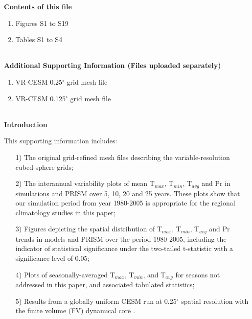 \documentclass[draft,ms]{agutexSI}
\begin{document}
\begin{article}

%
%



\noindent\textbf{Contents of this file}
\begin{enumerate}
\item Figures S1 to S19
\item Tables S1 to S4
\end{enumerate}
\ \\

\noindent\textbf{Additional Supporting Information (Files uploaded separately)}
\begin{enumerate}
\item VR-CESM 0.25$^\circ$ grid mesh file
\item VR-CESM 0.125$^\circ$ grid mesh file
\end{enumerate}
\ \\

\noindent\textbf{Introduction}


This supporting information includes:

\begin{itemize}
\item[1)] The original grid-refined mesh files describing the variable-resolution cubed-sphere grids;

\item[2)] The interannual variability plots of mean T$_{max}$, T$_{min}$, T$_{avg}$ and Pr in simulations and PRISM over 5, 10, 20 and 25 years.  These plots show that our simulation period from year 1980-2005 is appropriate for the regional climatology studies in this paper;

\item[3)] Figures depicting the spatial distribution of T$_{max}$, T$_{min}$, T$_{avg}$ and Pr trends in models and PRISM over the period 1980-2005, including the indicator of statistical significance under the two-tailed t-statistic with a significance level of 0.05;

\item[4)] Plots of seasonally-averaged T$_{max}$, T$_{min}$, and T$_{avg}$ for seasons not addressed in this paper, and associated tabulated statistics;

\item[5)] Results from a globally uniform CESM run at 0.25$^\circ$ spatial resolution with the finite volume (FV) dynamical core \citep{wehner2014effect}.
\end{itemize}



\end{article}
\end{document}
